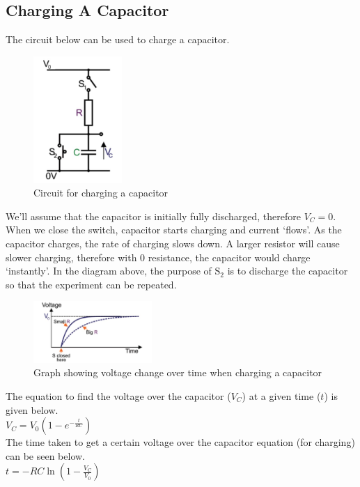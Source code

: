 \documentclass[a4paper,11pt, twocolumn]{article}
\begin{document}
\subsection{Charging A Capacitor}
The circuit below can be used to charge a capacitor.
\begin{figure}[H]
    \centering
    \includegraphics[width=0.3\textwidth]{images/chargingCapacitor.jpg}
    \caption{Circuit for charging a capacitor}
    \label{fig:chargingCapacitor}
\end{figure}
\noindent We'll assume that the capacitor is initially fully discharged, therefore $V_C = 0$. When we close the switch, capacitor starts charging and current `flows'. As the capacitor charges, the rate of charging slows down. A larger resistor will cause slower charging, therefore with 0 resistance, the capacitor would charge `instantly'. In the diagram above, the purpose of $\mathrm{S_2}$ is to discharge the capacitor so that the experiment can be repeated.
\begin{figure}[H]
    \centering
    \includegraphics[width=0.4\textwidth]{images/chargingCapGraph.jpg}
    \caption{Graph showing voltage change over time when charging a capacitor}
    \label{fig:chargingCapacitorGraph}
\end{figure}
\noindent The equation to find the voltage over the capacitor ($V_C$) at a given time ($t$) is given below.\\
$ \displaystyle V_C = V_0 \left(1-e^{ \displaystyle -\frac{t}{RC}} \right)$\\
The time taken to get a certain voltage over the capacitor equation (for charging) can be seen below.\\
$\displaystyle t = -RC \ln \left(\displaystyle 1- \frac{V_C}{V_0}\right)$
\end{document}
